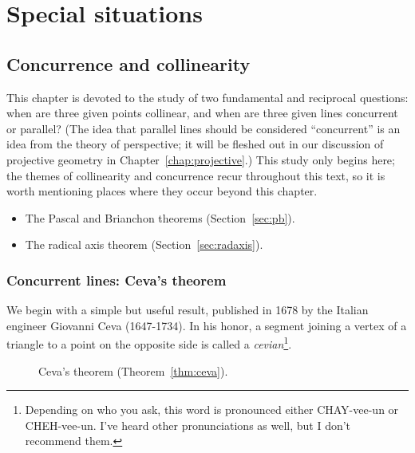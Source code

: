 \documentclass[12pt]{book}
\numberwithin{exc}{section}
\numberwithin{figure}{section}
\numberwithin{equation}{theorem}
\begin{document}
\part{Special situations}

\chapter{Concurrence and collinearity}

This chapter is devoted to the study of two fundamental and 
reciprocal questions: 
when are three given points collinear, and when are three given lines
concurrent or parallel? (The idea that parallel lines should be considered
``concurrent'' is an idea from the theory of perspective; it
will be fleshed out in our discussion of projective
geometry in Chapter~\ref{chap:projective}.)
This study only begins here; 
the themes of collinearity and concurrence recur throughout this text,
so it is worth mentioning places where they occur beyond this chapter.
\begin{itemize}
\item The Pascal and Brianchon theorems (Section~\ref{sec:pb}).
 
\item The radical axis theorem (Section~\ref{sec:radaxis}).
 
\end{itemize}

\section{Concurrent lines: Ceva's theorem}

We begin with a simple but useful result, published in 1678 by the Italian 
engineer Giovanni Ceva
(1647-1734). 
In his honor, a segment 
joining a vertex of a triangle to a point on the opposite side is 
called a \emph{cevian}\footnote{Depending on who you ask, this word
is pronounced either CHAY-vee-un or CHEH-vee-un. I've heard other
pronunciations as well, but I don't recommend them.}.
\begin{figure}[ht]
\caption{Ceva's theorem (Theorem~\ref{thm:ceva}).}
\end{figure}
\end{document}
